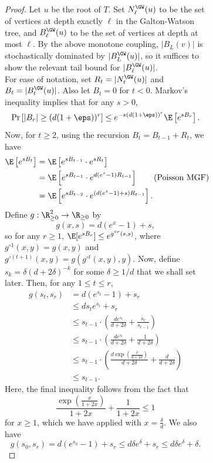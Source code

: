 \documentclass[11pt,letterpaper]{article}
\begin{document}
\begin{figure}
\begin{figure}
\begin{proof}
    Let $u$ be the root of $T$. Set $N^{\GW}_{\ell}(u)$ to be the set of vertices at depth exactly $\ell$ in the Galton-Watson tree, and $B^{\GW}_{\ell}(u)$ to be the set of vertices at depth at most $\ell$.
    By the above monotone coupling,  $|B_L(v)|$ is stochastically dominated by $|B^\GW_L(u)|$, so it suffices to show the relevant tail bound for $|B_\ell^{\GW}(u)|$.\\
    For ease of notation, set $R_t = |N^{\GW}_{t}(u)|$ and $B_t = |B^{\GW}_{t}(u)|$. Also let $B_t = 0$ for $t < 0$. Markov's inequality implies that for any $s > 0$,
    \[ \Pr\left[ |B_r| \ge (d(1+\eps))^r \right] \le e^{-s(d(1+\eps))^r} \E\left[ e^{sB_r} \right]. \]
    Now, for $t \ge 2$, using the recursion $B_t = B_{t-1} + R_t$, we have 
    \begin{align*}
        \E\left[ e^{sB_t} \right] &= \E\left[ e^{sB_{t-1}} \cdot e^{sR_t} \right] \\
            &= \E\left[ e^{sB_{t-1}} \cdot e^{d(e^s-1)R_{t-1}} \right] \tag{Poisson MGF} \\
            &= \E\left[ e^{sB_{t-2}} \cdot e^{(d(e^s-1) + s)R_{t-1}} \right]. 
    \end{align*}
    Define $g : \R_{\ge 0}^2 \to \R_{\ge 0}$ by
    \[ g(x,s) = d(e^x - 1) + s, \]
    so for any $r \ge 1$, $\E[e^{sB_r}] \le e^{g^{\circ r}(s,s)}$, where $g^{\circ 1}(x,y) = g(x,y)$ and $g^{\circ (t+1)}(x,y) = g(g^{\circ t}(x,y),y)$. Now, define $s_k = \delta (d+2\delta)^{-k}$ for some $\delta \ge 1/d$ that we shall set later. Then, for any $1 \le t \le r$,
    \begin{align*}
        g(s_t,s_r) &= d(e^{s_t} - 1) + s_r \\
            &\le d s_t e^{s_t} + s_r \\
            &\le s_{t-1} \cdot \left( \frac{de^{s_t}}{d+2\delta} + \frac{s_r}{s_{t-1}} \right) \\
            &\le s_{t-1} \cdot \left(\frac{de^{s_t}}{d+2\delta} + \frac{1}{d+2\delta}\right) \\
            &\le s_{t-1} \cdot \left(\frac{d\exp\left(\frac{\delta}{d+2\delta}\right)}{d+2\delta} + \frac{d}{d+2\delta}\right) \tag{$t \ge 1$} \\
            &\le s_{t-1}.
    \end{align*}
    Here, the final inequality follows from the fact that
    \[ \frac{\exp\left( \frac{x}{1+2x} \right)}{1+2x} + \frac{1}{1+2x} \le 1 \]
    for $x \ge 1$, which we have applied with $x = \frac{\delta}{d}$.
    We also have
    \[ g(s_0,s_r) = d(e^{s_0} - 1) + s_r \le d\delta e^{\delta} + s_r \le d\delta e^{\delta} + \delta. \]

\end{proof}
\end{figure}
\end{figure}
\end{document}
